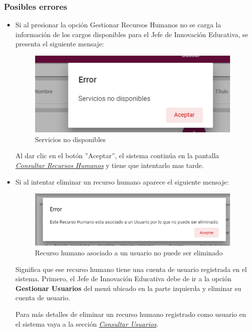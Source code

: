         \subsubsection{Posibles errores}
          \begin{itemize}
                \item Si al  presionar la opción Gestionar Recursos Humanos no se carga la información de los cargos disponibles para el Jefe de Innovación Educativa, se presenta el siguiente mensaje:

             \begin{figure}[H]
                \centering
                \includegraphics[width=0.4\linewidth]{images/SP1/MSGSN}
                \caption{Servicios no disponibles}
                \label{SND}

            \end{figure}

                    Al dar clic en el botón ''Aceptar'', el sistema continúa en la pantalla  \hyperlink{consultarRH}{\textit{Consultar Recursos Humanos}} y tiene que intentarlo  mas tarde.


              \item Si al intentar eliminar un recurso humano aparece el siguiente mensaje:
                \begin{figure}[H]
                   \centering
                   \includegraphics[width=0.4\linewidth]{images/SP1/MSG56}
                    \caption{Recurso humano asociado a un usuario no puede ser eliminado}
                   \label{mensaje56}
                \end{figure}

                Significa que ese recurso humano tiene una cuenta de usuario registrada en el sistema. Primero, el Jefe de Innovación Educativa debe de ir a la opción \textbf{Gestionar Usuarios} del menú ubicado en la parte izquierda y eliminar su cuenta de usuario.

                Para más detalles de eliminar un recurso humano registrado como usuario en el sistema vaya a la sección \hyperlink{consultarUs}{\textit{Consultar Usuarios}}.


           \end{itemize}

